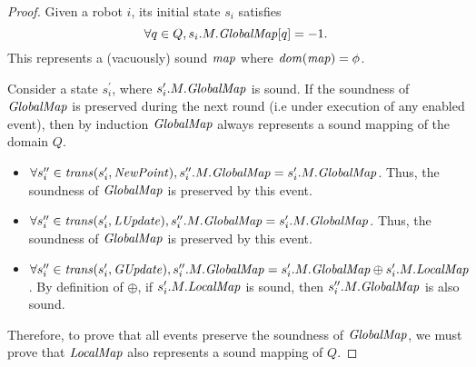 \begin{proof}
    Given a robot $i$, its initial state $s_i$ satisfies $$\forall q \in Q, s_i.M.\mathit{GlobalMap}[q] = -1.$$ This represents a (vacuously) sound \qdfunc $\mathit{map}$ where $\mathit{dom}(\mathit{map}) = \phi$.


    Consider a state $s_i^\prime$, where $s_i^\prime.M.\mathit{GlobalMap}$ is sound. If the soundness of $\mathit{GlobalMap}$ is preserved during the next round (i.e under execution of any enabled event), then by induction $\mathit{GlobalMap}$ always represents a sound mapping of the domain $Q$. \begin{itemize}
                                                                                                                                                                                                                                                                      \item $\forall s_i^{\prime\prime} \in \mathit{trans}(s_i^\prime,\mathit{NewPoint}), s_i^{\prime\prime}.M.\mathit{GlobalMap} = s_i^\prime.M.\mathit{GlobalMap}$. Thus, the soundness of $\mathit{GlobalMap}$ is preserved by this event.
                                                                                                                                                                                                                                                                      \item $\forall s_i^{\prime\prime} \in \mathit{trans}(s_i^\prime,\mathit{LUpdate}), s_i^{\prime\prime}.M.\mathit{GlobalMap} = s_i^\prime.M.\mathit{GlobalMap}$. Thus, the soundness of $\mathit{GlobalMap}$ is preserved by this event.
                                                                                                                                                                                                                                                                      \item $\forall s_i^{\prime\prime} \in \mathit{trans}(s_i^\prime,\mathit{GUpdate}), s_i^{\prime\prime}.M.\mathit{GlobalMap} = s_i^\prime.M.\mathit{GlobalMap} \oplus s_i^\prime.M.\mathit{LocalMap}$. By definition of $\oplus$, if $s_i^\prime.M.\mathit{LocalMap}$ is sound, then $s_i^{\prime\prime}.M.\mathit{GlobalMap}$ is also sound.
    \end{itemize}

    Therefore, to prove that all events preserve the soundness of $\mathit{GlobalMap}$, we must prove that $\mathit{LocalMap}$ also represents a sound mapping of $Q$.

\end{proof}
